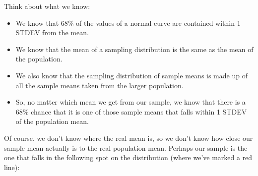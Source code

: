 \documentclass[../../../main.tex]{subfiles}
\begin{document}
\noindent
Think about what we know:

\begin{itemize}

  \item We know that 68\% of the values of a normal curve are contained within 1 STDEV from the mean.

  \item We know that the mean of a sampling distribution is the same as the mean of the population.

  \item We also know that the sampling distribution of sample means is made up of all the sample means taken from the larger population.

  \item So, no matter which mean we get from our sample, we know that there is a 68\% chance that it is one of those sample means that falls within 1 STDEV of the population mean.

\end{itemize}

\noindent
Of course, we don't know where the real mean is, so we don't know how close our sample mean actually is to the real population mean. Perhaps our sample is the one that falls in the following spot on the distribution (where we've marked a red line):

\begin{center}
\end{center}
\end{document}
